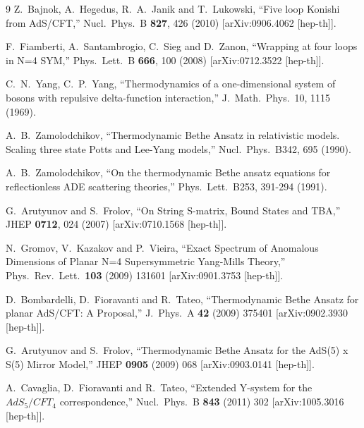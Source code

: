 \documentclass[a4paper]{article}
\numberwithin{equation}{section}
\begin{document}
\begin{thebibliography} {9}
  Z.~Bajnok, A.~Hegedus, R.~A.~Janik and T.~Lukowski,
  ``Five loop Konishi from AdS/CFT,''
  Nucl.\ Phys.\ B {\bf 827}, 426 (2010)
  [arXiv:0906.4062 [hep-th]].
  
  F.~Fiamberti, A.~Santambrogio, C.~Sieg and D.~Zanon,
  ``Wrapping at four loops in N=4 SYM,''
  Phys.\ Lett.\ B {\bf 666}, 100 (2008)
  [arXiv:0712.3522 [hep-th]].
  
	C.~N.~Yang, C.~P.~Yang, 
	``Thermodynamics of a one-dimensional system of bosons with repulsive delta-function interaction,''
	J.\ Math.\ Phys.\ 10, 1115 (1969).

	A.~B.~Zamolodchikov, 
	``Thermodynamic Bethe Ansatz in relativistic models. Scaling three state Potts and Lee-Yang models,''
	Nucl.\ Phys.\ B342, 695 (1990).

	A.~B.~Zamolodchikov,
	``On the thermodynamic Bethe ansatz equations for reflectionless ADE scattering theories,''
	Phys.\ Lett.\ B253, 391-294 (1991).
	
  G.~Arutyunov and S.~Frolov,
  ``On String S-matrix, Bound States and TBA,''
  JHEP {\bf 0712}, 024 (2007)
  [arXiv:0710.1568 [hep-th]].


  N.~Gromov, V.~Kazakov and P.~Vieira,
  ``Exact Spectrum of Anomalous Dimensions of Planar N=4 Supersymmetric Yang-Mills Theory,''
  Phys.\ Rev.\ Lett.\  {\bf 103} (2009) 131601
  [arXiv:0901.3753 [hep-th]].


  D.~Bombardelli, D.~Fioravanti and R.~Tateo,
  ``Thermodynamic Bethe Ansatz for planar AdS/CFT: A Proposal,''
  J.\ Phys.\ A {\bf 42} (2009) 375401
  [arXiv:0902.3930 [hep-th]].

  G.~Arutyunov and S.~Frolov,
  ``Thermodynamic Bethe Ansatz for the AdS(5) x S(5) Mirror Model,''
  JHEP {\bf 0905} (2009) 068
  [arXiv:0903.0141 [hep-th]].

  A.~Cavaglia, D.~Fioravanti and R.~Tateo,
  ``Extended Y-system for the $AdS_5/CFT_4$ correspondence,''
  Nucl.\ Phys.\ B {\bf 843} (2011) 302
  [arXiv:1005.3016 [hep-th]].


\end{thebibliography}
\end{document}
